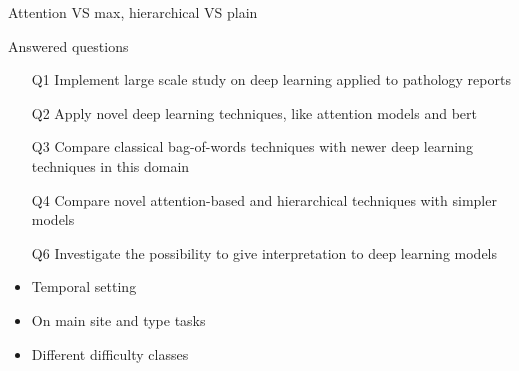 \begin{frame}{Attention VS max, hierarchical VS plain}
  \begin{block}{Answered questions}
  \begin{itemize}
  \item[Q1] Implement \alert{large scale} study on deep learning
    applied to pathology reports
  \item[Q2] Apply \alert{novel} deep learning techniques, like
    \alert{attention} models and \alert{\acs{bert}}
  \item[Q3] \alert{Compare} classical \alert{bag-of-words} techniques with
    newer deep learning techniques in this domain
  \item[Q4] \alert{Compare} novel \alert{attention}-based and
    \alert{hierarchical} techniques with simpler models
  \item[Q6] \alert{Investigate} the possibility to give
    \alert{interpretation} to deep learning models
  \end{itemize}
\end{block}
\begin{itemize}
\item \alert{Temporal} setting
\item On \alert{main site} and \alert{type} tasks
\item Different \alert{difficulty} classes
\end{itemize}
\end{frame}

